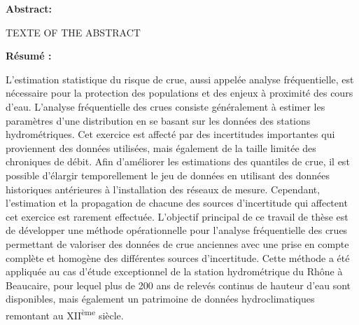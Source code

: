 \thispagestyle{empty}

\noindent \textbf{Abstract:}

\noindent TEXTE OF THE ABSTRACT 

\vfill

\noindent \textbf{Résumé :}

\noindent \small{L'estimation statistique du risque de crue, aussi appelée analyse fréquentielle, est nécessaire pour la protection des populations et des enjeux à proximité des cours d'eau. L'analyse fréquentielle des crues consiste généralement à estimer les paramètres d'une distribution en se basant sur les données des stations hydrométriques. Cet exercice est affecté par des incertitudes importantes qui proviennent des données utilisées, mais également de la taille limitée des chroniques de débit. Afin d'améliorer les estimations des quantiles de crue, il est possible d'élargir temporellement le jeu de données en utilisant des données historiques antérieures à l'installation des réseaux de mesure. Cependant, l'estimation et la propagation de chacune des sources d'incertitude qui affectent cet exercice est rarement effectuée. L'objectif principal de ce travail de thèse est de développer une méthode opérationnelle pour l'analyse fréquentielle des crues permettant de valoriser des données de crue anciennes avec une prise en compte complète et homogène des différentes sources d'incertitude. Cette méthode a été appliquée au cas d'étude exceptionnel de la station hydrométrique du Rhône à Beaucaire, pour lequel plus de 200 ans de relevés continus de hauteur d'eau sont disponibles, mais également un patrimoine de données hydroclimatiques remontant au XII\textsuperscript{ème} siècle. 

}